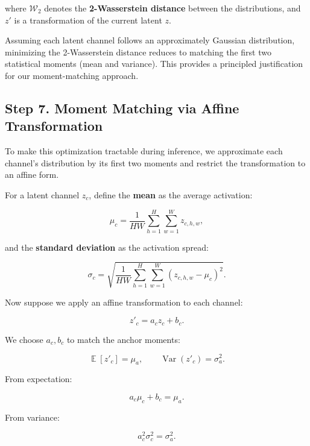 \documentclass[12pt]{article}
\DeclareMathOperator{\Var}{Var}
\DeclareMathOperator{\E}{\mathbb{E}}
\begin{document}
where $\mathcal{W}_2$ denotes the \textbf{2-Wasserstein distance} between the distributions, and $z'$ is a transformation of the current latent $z$.

Assuming each latent channel follows an approximately Gaussian distribution, minimizing the 2-Wasserstein distance reduces to matching the first two statistical moments (mean and variance). This provides a principled justification for our moment-matching approach.

\subsection{Step 7. Moment Matching via Affine Transformation}

To make this optimization tractable during inference, we approximate each channel's distribution by its first two moments and restrict the transformation to an affine form.

For a latent channel $z_c$, define the \textbf{mean} as the average activation:

\begin{equation}
\mu_c = \frac{1}{HW} \sum_{h=1}^{H} \sum_{w=1}^{W} z_{c,h,w},
\end{equation}

and the \textbf{standard deviation} as the activation spread:

\begin{equation}
\sigma_c = \sqrt{ \frac{1}{HW} \sum_{h=1}^{H} \sum_{w=1}^{W} (z_{c,h,w} - \mu_c)^2 }.
\end{equation}

Now suppose we apply an affine transformation to each channel:

\begin{equation}
z'_c = a_c z_c + b_c.
\end{equation}

We choose $a_c, b_c$ to match the anchor moments:

\begin{equation}
\E[z'_c] = \mu_a, \qquad \Var(z'_c) = \sigma_a^2.
\end{equation}

From expectation:

\begin{equation}
a_c \mu_c + b_c = \mu_a.
\end{equation}

From variance:

\begin{equation}
a_c^2 \sigma_c^2 = \sigma_a^2.
\end{equation}
\end{document}
